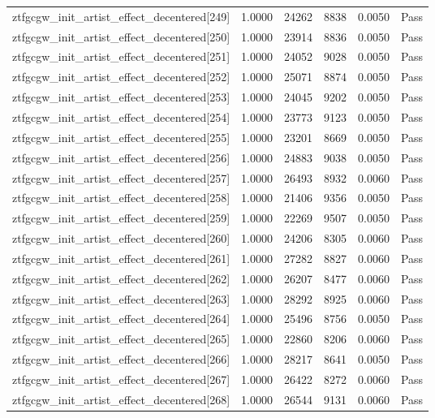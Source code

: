 \begin{table}[htbp]
\begin{tabular}{llrrll}
ztfgcgw\_init\_artist\_effect\_decentered[249] & 1.0000 & 24262 & 8838 & 0.0050 & Pass \\
ztfgcgw\_init\_artist\_effect\_decentered[250] & 1.0000 & 23914 & 8836 & 0.0050 & Pass \\
ztfgcgw\_init\_artist\_effect\_decentered[251] & 1.0000 & 24052 & 9028 & 0.0050 & Pass \\
ztfgcgw\_init\_artist\_effect\_decentered[252] & 1.0000 & 25071 & 8874 & 0.0050 & Pass \\
ztfgcgw\_init\_artist\_effect\_decentered[253] & 1.0000 & 24045 & 9202 & 0.0050 & Pass \\
ztfgcgw\_init\_artist\_effect\_decentered[254] & 1.0000 & 23773 & 9123 & 0.0050 & Pass \\
ztfgcgw\_init\_artist\_effect\_decentered[255] & 1.0000 & 23201 & 8669 & 0.0050 & Pass \\
ztfgcgw\_init\_artist\_effect\_decentered[256] & 1.0000 & 24883 & 9038 & 0.0050 & Pass \\
ztfgcgw\_init\_artist\_effect\_decentered[257] & 1.0000 & 26493 & 8932 & 0.0060 & Pass \\
ztfgcgw\_init\_artist\_effect\_decentered[258] & 1.0000 & 21406 & 9356 & 0.0050 & Pass \\
ztfgcgw\_init\_artist\_effect\_decentered[259] & 1.0000 & 22269 & 9507 & 0.0050 & Pass \\
ztfgcgw\_init\_artist\_effect\_decentered[260] & 1.0000 & 24206 & 8305 & 0.0060 & Pass \\
ztfgcgw\_init\_artist\_effect\_decentered[261] & 1.0000 & 27282 & 8827 & 0.0060 & Pass \\
ztfgcgw\_init\_artist\_effect\_decentered[262] & 1.0000 & 26207 & 8477 & 0.0060 & Pass \\
ztfgcgw\_init\_artist\_effect\_decentered[263] & 1.0000 & 28292 & 8925 & 0.0060 & Pass \\
ztfgcgw\_init\_artist\_effect\_decentered[264] & 1.0000 & 25496 & 8756 & 0.0050 & Pass \\
ztfgcgw\_init\_artist\_effect\_decentered[265] & 1.0000 & 22860 & 8206 & 0.0060 & Pass \\
ztfgcgw\_init\_artist\_effect\_decentered[266] & 1.0000 & 28217 & 8641 & 0.0050 & Pass \\
ztfgcgw\_init\_artist\_effect\_decentered[267] & 1.0000 & 26422 & 8272 & 0.0060 & Pass \\
ztfgcgw\_init\_artist\_effect\_decentered[268] & 1.0000 & 26544 & 9131 & 0.0060 & Pass \\

\end{tabular}
\end{table}
